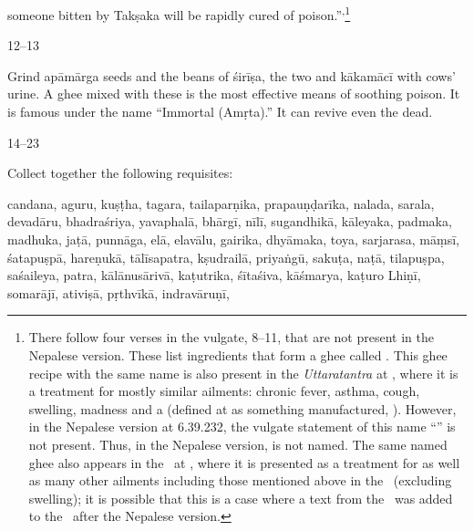 \begin{translation}
{                        someone bitten by Takṣaka will be rapidly cured of
                        poison.”}\textsuperscript{,}\footnote{There follow
                            four verses in the vulgate, 8--11, that are not
                            present in the Nepalese version.  These list
                            ingredients that form a ghee called
                            . This ghee recipe with
                            the same name is also present in the
                            \emph{Uttaratantra} at , where
                            it is a treatment for mostly similar ailments:
                            chronic fever, asthma, cough, swelling, madness and a
                             (defined at
                             as something manufactured,
                            ).  However, in the Nepalese version at
                            6.39.232, the vulgate statement of this name
                            “” is
                            not present. Thus, in the Nepalese version,
                             is not named. The same
                            named ghee also appears in the \CS\ at
                            , where it is presented as a
                            treatment for  as well as many
                            other ailments including those mentioned above in the
                            \SS\ (excluding swelling); it is possible that this
                            is a case where a text from the \CS\ was added to the
                            \SS\ after the Nepalese version.}
        
    
\item [12--13]    

Grind \gls{apāmārga} seeds and the beans of \gls{śirīṣa}, the two 
 and \gls{kākamācī} with cows' urine.  A ghee mixed with 
these is the most effective means of soothing poison.  It is famous under the 
name “Immortal (Amṛta).”  It can revive even the dead.


\item [14--23] 

Collect together the following requisites:

\gls{candana}, \gls{aguru},  \gls{kuṣṭha},  \gls{tagara},  
\gls{tailaparṇika}, 
\gls{prapauṇḍarīka},  
\gls{nalada},  
\gls{sarala},  
\gls{devadāru}, 
\gls{bhadraśriya},  
\gls{yavaphalā},  
\gls{bhārgī}, 
\gls{nīlī},  
\gls{sugandhikā}, 
\gls{kāleyaka},  
\gls{padmaka},  
\gls{madhuka},  
 \gls{jaṭā}, 
\gls{punnāga},
\gls{elā},  
\gls{elavālu},  \gls{gairika},  \gls{dhyāmaka},  
\gls{toya},  
\gls{sarjarasa}, 
\gls{māṃsī},  
\gls{śatapuṣpā},  
\gls{hareṇukā}, 
\gls{tālīsapatra},   
\gls{kṣudrailā},   
\gls{priyaṅgū},   
\gls{sakuṭa},   
\gls{naṭā},  
\gls{tilapuṣpa},   
\gls{saśaileya},   
\gls{patra},  
\gls{kālānusārivā},  
\gls{kaṭutrika},   
\gls{śītaśiva},   
\gls{kāśmarya},   
\gls{kaṭuro Lhiṇī},  
\gls{somarājī},   
\gls{ativiṣā},  
\gls{pṛthvīkā},  
\gls{indravāruṇī}, 


\end{translation}
